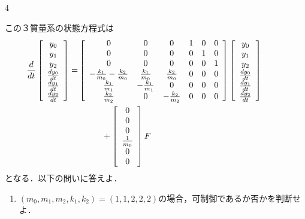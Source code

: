 \documentclass[fleqn]{article}
\begin{document}
\begin{multicols}{4}
\begin{enumerate}
この３質量系の状態方程式は
{\footnotesize
\begin{align*} 
\hspace*{-10mm}
 \frac{d}{dt} \left[\begin{array}{c}
	         y_0 \\
		     y_1 \\
		     y_2 \\
		     \frac{dy_0}{dt} \\
		     \frac{dy_1}{dt} \\
		     \frac{dy_2}{dt}
		    \end{array}\right]
 =&
 \left[\begin{array}{cccccc}
        0 & 0 & 0 & 1 & 0 & 0      \\
        0 & 0 & 0 & 0 & 1 & 0      \\
        0 & 0 & 0 & 0 & 0 & 1      \\
	-\frac{k_1}{m_0} -\frac{k_2}{m_0}&  \frac{k_1}{m_0} &  \frac{k_2}{m_0} & 0 & 0 & 0 \\
	 \frac{k_1}{m_1}                & -\frac{k_1}{m_1} &  0               & 0 & 0 & 0 \\
	 \frac{k_2}{m_2}                &  0               & -\frac{k_2}{m_2} & 0 & 0 & 0 
       \end{array}\right]
 \left[\begin{array}{c}
	         y_0 \\
		     y_1 \\
		     y_2 \\
		     \frac{dy_0}{dt} \\
		     \frac{dy_1}{dt} \\
		     \frac{dy_2}{dt}
       \end{array}\right]
\\
 &\hspace*{10mm} +
 \left[\begin{array}{c}
        0 \\
        0 \\
        0 \\
	    \frac{1}{m_0} \\
	    0 \\
	    0 
       \end{array}\right]
        F
\end{align*}
}
となる．以下の問いに答えよ．

\begin{enumerate}
\item 
$(m_0, m_1, m_2, k_1, k_2)=(1,1,2,2,2)$の場合，可制御であるか否かを判断せよ．
\vspace{8cm}
\vfill\null
\columnbreak


\end{enumerate}
\end{enumerate}
\end{multicols}
\end{document}
